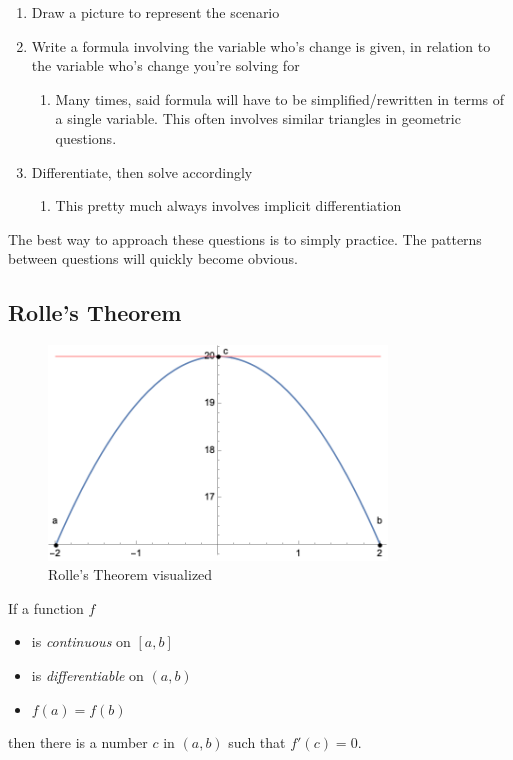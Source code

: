 \documentclass[12pt]{article}
\begin{document}
\begin{enumerate}
    \item Draw a picture to represent the scenario
    \item Write a formula involving the variable who's change is given, in relation to the variable who's change you're solving for
    \begin{enumerate}
        \item Many times, said formula will have to be simplified/rewritten in terms of a single variable. This often involves similar triangles in geometric questions.
    \end{enumerate}
    \item Differentiate, then solve accordingly
    \begin{enumerate}
        \item This pretty much always involves implicit differentiation
    \end{enumerate}
\end{enumerate}

The best way to approach these questions is to simply practice. The patterns between questions will quickly become obvious.
\subsection{Rolle's Theorem}
\begin{figure}[!ht]
    \centering
    \includegraphics[width=9cm]{misc/rolles.png}
    \caption{Rolle's Theorem visualized}
    \label{fig:rolles}
\end{figure}
\begin{shaded}
If a function $f$
\begin{itemize}
    \item is \textit{continuous} on $[a,b]$
    \item is \textit{differentiable} on $(a,b)$
    \item $f(a) = f(b)$
\end{itemize}
then there is a number $c$ in $(a,b)$ such that $f'(c) = 0$.
\end{shaded}
\end{document}
